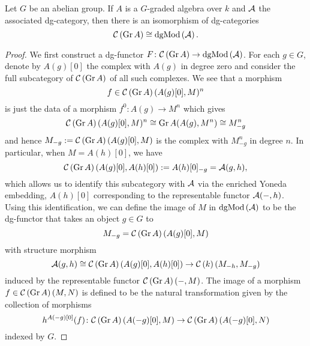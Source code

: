 \documentclass[dissertation.tex]{subfiles}
\begin{document}
\begin{lemma}\label{lem:GrModAsMod}
  Let \(G\) be an abelian group.
  If \(A\) is a \(G\)-graded algebra over \(k\) and \(\mathcal{A}\) the associated dg-category, then there is an isomorphism of dg-categories
  \[\mathcal{C}\left(\operatorname{Gr}A\right) \cong \operatorname{dgMod}\left(\mathcal{A}\right).\]

  \begin{proof}
    We first construct a dg-functor \(F \colon \mathcal{C}\left(\operatorname{Gr}A\right) \to \operatorname{dgMod}\left(\mathcal{A}\right)\).
    For each \(g \in G\), denote by \(A(g)[0]\) the complex with \(A(g)\) in degree zero and consider the full subcategory of \(\mathcal{C}\left(\operatorname{Gr}A\right)\) of all such complexes.
    We see that a morphism \[f \in \mathcal{C}\left(\operatorname{Gr}A\right)(A(g)[0],M)^n\] is just the data of a morphism \(f^0 \colon A(g) \to M^n\) which gives
    \[\mathcal{C}\left(\operatorname{Gr}A\right)(A(g)[0],M)^n \cong \operatorname{Gr}A(A(g), M^n) \cong M^n_{-g}\]
    and hence \(M_{-g} := \mathcal{C}\left(\operatorname{Gr}A\right)(A(g)[0], M)\) is the complex with \(M^n_{-g}\) in degree \(n\).
    In particular, when \(M = A(h)[0]\), we have
    \[\mathcal{C}\left(\operatorname{Gr}A\right)(A(g)[0],A(h)[0]) := A(h)[0]_{-g} = \mathcal{A}(g,h),\]
    which allows us to identify this subcategory with \(\mathcal{A}\) via the enriched Yoneda embedding, \(A(h)[0]\) corresponding to the representable functor \(\mathcal{A}(-,h)\).
    Using this identification, we can define the image of \(M\) in \(\operatorname{dgMod}\left(\mathcal{A}\right)\) to be the dg-functor that takes an object \(g \in G\) to
    \[M_{-g} = \mathcal{C}\left(\operatorname{Gr}A\right)(A(g)[0], M)\]
    with structure morphism
    \[\mathcal{A}(g,h) \cong \mathcal{C}\left(\operatorname{Gr}A\right)(A(g)[0], A(h)[0]) \to \mathcal{C}\left(k\right)(M_{-h}, M_{-g})\]
    induced by the representable functor \(\mathcal{C}\left(\operatorname{Gr}A\right)(-, M)\).
    The image of a morphism \(f \in \mathcal{C}\left(\operatorname{Gr}A\right)(M,N)\) is defined to be the natural transformation given by the collection of morphisms
    \[h^{A(-g)[0]}(f) \colon \mathcal{C}\left(\operatorname{Gr}A\right)(A(-g)[0], M) \to \mathcal{C}\left(\operatorname{Gr}A\right)(A(-g)[0],N)\]
    indexed by \(G\).


\end{proof}
\end{lemma}
\end{document}

